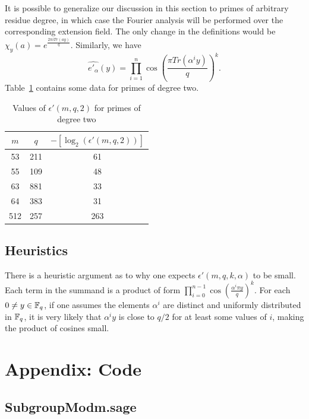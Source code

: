 \documentclass[envcountsame]{llncs}
\begin{document}
It is possible to generalize our discussion in this section to primes of arbitrary residue degree, in which case the Fourier analysis will be performed over the corresponding extension field. The only change in the definitions would be $\chi_y(a) = e^{ \frac{2 \pi i Tr(a y)}{q}}$. Similarly, we have
\[
    \widehat{e'_\alpha}(y) = \prod_{i=1}^{n} \cos \left(\frac{ \pi Tr(\alpha^i y) }{q} \right)^k.
\]
Table~\ref{tab: deg2} contains some data for primes of degree two.

\begin{table}[H]
\caption{Values of $\epsilon'(m,q,2)$ for primes of degree two}
\begin{center}
\begin{tabular}{c|c|c} \label{tab: deg2}
$m$ & $q$ & $-[\log_2(\epsilon'(m,q,2))]$ \\
\hline
53 & 211 & 61 \\
55 & 109 & 48 \\
63 & 881 & 33 \\
64 & 383 & 31 \\
512 & 257 & 263
\end{tabular}
\end{center}
\end{table}

\subsection{Heuristics}

There is a heuristic argument as to why one expects $\epsilon'(m,q,k,\alpha)$ to be small. Each term in the summand is a product of form $\prod_{i=0}^{n-1} \cos \left(\frac{ \alpha^i \pi y}{q} \right)^k$. For each $0 \neq y \in \mathbb{F}_q$, if one assumes the elements $\alpha^i$ are distinct and uniformly distributed in $\mathbb{F}_q$, it is very likely that $\alpha^i y$ is close to $q/2$ for at least some values of $i$, making the product of cosines small.




\section{Appendix: Code}

\subsection{SubgroupModm.sage}
\end{document}
